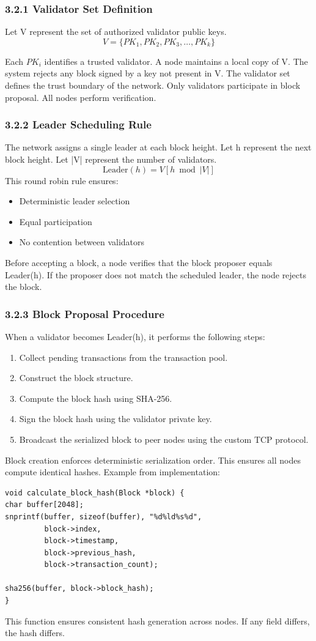 \subsubsection*{3.2.1 Validator Set Definition}
Let V represent the set of authorized validator public keys.
\[
V = \{ PK_1, PK_2, PK_3, \dots, PK_k \}
\]

Each $PK_i$ identifies a trusted validator. A node maintains a local copy of V. The system rejects any block signed by a key not present in V.
The validator set defines the trust boundary of the network. Only validators participate in block proposal. All nodes perform verification.
\subsubsection*{3.2.2 Leader Scheduling Rule}
The network assigns a single leader at each block height.
Let h represent the next block height.
Let |V| represent the number of validators.
\[
\mathrm{Leader}(h) = V[h \bmod |V|]
\]
This round robin rule ensures:
\begin{itemize}
\item Deterministic leader selection
\item Equal participation
\item No contention between validators
\end{itemize}
Before accepting a block, a node verifies that the block proposer equals Leader(h). If the proposer does not match the scheduled leader, the node rejects the block.

\subsubsection*{3.2.3 Block Proposal Procedure}
When a validator becomes Leader(h), it performs the following steps:
\begin{enumerate}
\item Collect pending transactions from the transaction pool.
\item Construct the block structure.
\item Compute the block hash using SHA-256.
\item Sign the block hash using the validator private key.
\item Broadcast the serialized block to peer nodes using the custom TCP protocol.
\end{enumerate}
Block creation enforces deterministic serialization order. This ensures all nodes compute identical hashes.
Example from implementation:
\begin{verbatim}
void calculate_block_hash(Block *block) {
char buffer[2048];
snprintf(buffer, sizeof(buffer), "%d%ld%s%d",
         block->index,
         block->timestamp,
         block->previous_hash,
         block->transaction_count);

sha256(buffer, block->block_hash);
}
\end{verbatim}
This function ensures consistent hash generation across nodes. If any field differs, the hash differs.
